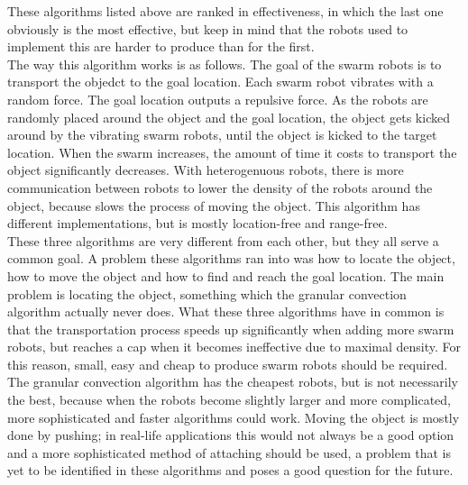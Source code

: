 These algorithms listed above are ranked in effectiveness, in which the last one obviously is the most effective, but keep in mind that the robots used to implement this are harder to produce than for the first. \\ The way this algorithm works is as follows. The goal of the swarm robots is to transport the objedct to the goal location. Each swarm robot vibrates with a random force. The goal location outputs a repulsive force. As the robots are randomly placed around the object and the goal location, the object gets kicked around by the vibrating swarm robots, until the object is kicked to the target location. When the swarm increases, the amount of time it costs to transport the object significantly decreases. With heterogenuous robots, there is more communication between robots to lower the density of the robots around the object, because slows the process of moving the object.  This algorithm has different implementations, but is mostly location-free and  range-free. \\

These three algorithms are very different from each other, but they all serve a common goal. A problem these algorithms ran into was how to locate the object, how to move the object and how to find and reach the goal location. The main problem is locating the object, something which the granular convection algorithm actually never does.  What these three algorithms have in common is that the transportation process speeds up significantly when adding more swarm robots, but reaches a cap when it becomes ineffective due to maximal density. For this reason, small, easy and cheap to produce swarm robots should be required. The granular convection algorithm has the cheapest robots, but is not necessarily the best, because when the robots become slightly larger and more complicated, more sophisticated and faster algorithms could work. Moving the object is mostly done by pushing; in real-life applications this would not always be a good option and a more sophisticated method of attaching should be used, a problem that is yet to be identified in these algorithms and poses a good question for the future. 

